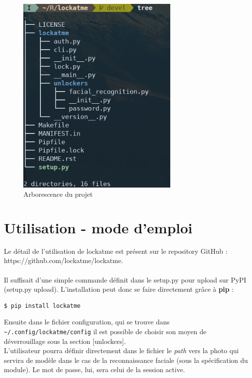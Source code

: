 \documentclass[french]{report}
\begin{document}
\begin{figure}[h]\label{fig:tree}
\begin{center}
  \includegraphics[width=80mm,scale=0.5]{tree}
\end{center}
  \caption{Arborescence du projet}
  \label{fig:tree}
\end{figure}

\section{Utilisation - mode d'emploi}
Le détail de l'utilisation de lockatme est présent sur le repository GitHub :\\
https://github.com/lockatme/lockatme.\\\\
Il suffisait d'une simple commande définit dans le setup.py pour upload sur PyPI (setup.py upload).
L'installation peut donc se faire directement grâce à \textbf{pip} :
\begin{lstlisting}[language=bash]
  $ pip install lockatme
\end{lstlisting}

Ensuite dans le fichier configuration, qui se trouve dans \verb|~/.config/lockatme/config|
il est possible de choisir son moyen de déverrouillage sous la section [unlockers].
\\
L'utilisateur pourra définir directement dans le fichier le \emph{path} vers la photo qui servira
de modèle dans le cas de la reconnaissance faciale (sous la spécification du module). Le mot de passe, lui, sera celui de
la session active.
\end{document}
